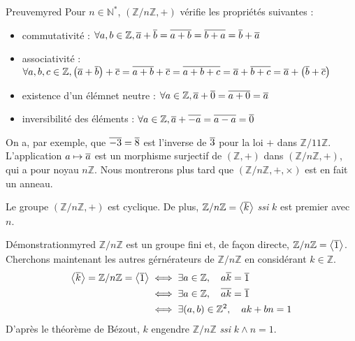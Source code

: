     \begin{demo}{Preuve}{myred}
        Pour $n \in \mathbb{N}^*$, $(\mathbb{Z} / n \mathbb{Z}, +)$ vérifie les propriétés suivantes :
        \begin{itemize}
            \item commutativité : $\forall a,b \in \mathbb{Z}, \overline{a} + \overline{b} = \overline{a+b} = \overline{b+a} = \overline{b} + \overline{a}$
            \item associativité : $\forall a,b,c \in \mathbb{Z}, \left(\overline{a} + \overline{b}\right) + \overline{c} = \overline{a+b} + \overline{c} = \overline{a+b+c} = \overline{a} + \overline{b + c} = \overline{a} + \left(\overline{b} + \overline{c}\right)$
            \item existence d’un élémnet neutre : $\forall a \in \mathbb{Z}, \overline{a} + \overline{0} = \overline{a + 0} = \overline{a}$
            \item inversibilité des éléments : $\forall a \in \mathbb{Z}, \overline{a} + \overline{-a} = \overline{a - a} = \overline{0}$
        \end{itemize}
    \end{demo}
    
    On a, par exemple, que $\overline{-3} = \overline{8}$ est l’inverse de $\overline{3}$ pour la loi $+$ dans $\mathbb{Z} / 11 \mathbb{Z}$. L’application $a \mapsto \overline{a}$ est un morphisme surjectif de $(\mathbb{Z},+)$ dans $(\mathbb{Z} / n \mathbb{Z}, +)$, qui a pour noyau $n \mathbb{Z}$. Nous montrerons plus tard que $(\mathbb{Z} / n \mathbb{Z},+, \times)$ est en fait un anneau.

    \begin{theo}{}{}
        Le groupe $(\mathbb{Z} / n \mathbb{Z},+)$ est cyclique. De plus, $\mathbb{Z} / n \mathbb{Z} = \left< \overline{k} \right>$ \textit{ssi} $k$ est premier avec $n$.
    \end{theo}

    \begin{demo}{Démonstration}{myred}
        $\mathbb{Z} / n \mathbb{Z}$ est un groupe fini et, de façon directe, $\mathbb{Z} / n \mathbb{Z} = \left< \overline{1} \right>$. Cherchons maintenant les autres gérnérateurs de $\mathbb{Z} / n \mathbb{Z}$ en considérant $k \in \mathbb{Z}$. 
        \begin{align*}
            \left< \overline{k} \right> = \mathbb{Z} / n \mathbb{Z} = \left< \overline{1} \right>
            &\iff \exists a \in \mathbb{Z}, \quad a \overline{k} = \overline{1} \\
            &\iff \exists a \in \mathbb{Z}, \quad \overline{ak} = \overline{1} \\
            &\iff \exists (a,b) \in \mathbb{Z}^2, \quad ak + bn = 1
        \end{align*}
        D’après le théorème de Bézout, $k$ engendre $\mathbb{Z} / n \mathbb{Z}$ \textit{ssi} $k \wedge n = 1$.
    \end{demo}

